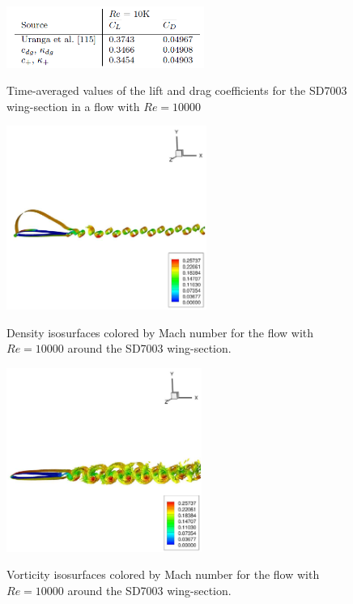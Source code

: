 \begin{figure}
\centering
\includegraphics[height=20mm]{table_927} \\
\caption{Time-averaged values of the lift and drag coefficients for the SD7003 wing-section in a flow with $Re = 10000$}
\label{fig:table_927}
\end{figure}

\begin{figure}
\centering
\includegraphics[height=60mm]{figure_939a} \\
\caption{Density isosurfaces colored by Mach number for the flow with $Re = 10000$ around the SD7003 wing-section.}
\label{fig:figure_939a}
\end{figure}

\begin{figure}
\centering
\includegraphics[height=60mm]{figure_939b} \\
\caption{Vorticity isosurfaces colored by Mach number for the flow with $Re = 10000$ around the SD7003 wing-section.}
\label{fig:figure_939b}
\end{figure}
\newpage
